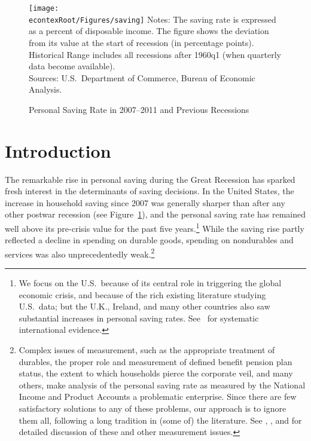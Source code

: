 \documentclass[titlepage]{\econtex}
\begin{document}
\titlepagefinish

\setcounter{page}{1}

\begin{figure}
\caption{Personal Saving Rate in 2007--2011 and Previous Recessions}
\label{fSRrec}
\texttt{[image: \\econtexRoot/Figures/saving]}
\footnotesize Notes: The saving rate is expressed as a percent of disposable income. The figure shows the deviation from its value at the start of recession (in percentage points). Historical Range includes all recessions after 1960q1 (when quarterly data become available).\\[-2mm]

\tiny Sources: U.S.\ Department of Commerce, Bureau of Economic Analysis.
\end{figure}

\section{Introduction}
 

The remarkable rise in personal saving during the Great Recession has sparked fresh interest in the determinants of saving decisions.  In the United States, the increase in household saving since 2007 was generally sharper than after any other postwar recession (see Figure~\ref{fSRrec}), and the personal saving rate has remained well above its pre-crisis value for the past five years.\footnote{We focus on the U.S.\ because of its central role in triggering the global economic crisis, and because of the rich existing literature studying U.S.\ data; but the U.K., Ireland, and many other countries also saw substantial increases in personal saving rates.  See~\cite{mosPSinGR} for systematic international evidence.}  While the saving rise partly reflected a decline in spending on durable goods, spending on nondurables and services was also unprecedentedly weak.\footnote{Complex issues of measurement, such as the appropriate treatment of durables, the proper role and measurement of defined benefit pension plan status, the extent to which households pierce the corporate veil, and many others, make analysis of the personal saving rate as measured by the National Income and Product Accounts a problematic enterprise.  Since there are few satisfactory solutions to any of these problems, our approach is to ignore them all, following a long tradition in (some of) the literature.  See \cite{kmitchSaving}, \cite{prSaving}, and \cite{CBOSaving} for detailed discussion of these and other measurement issues.}
\end{document}

